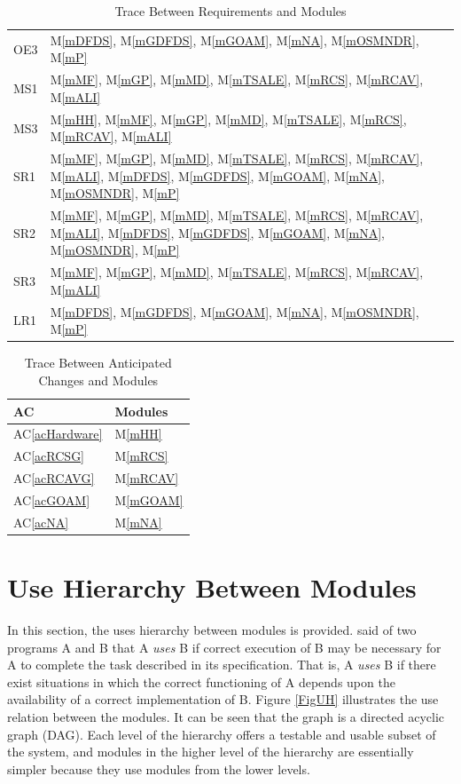 \documentclass[12pt, titlepage]{article}
\newcommand{\acref}[1]{AC\ref{#1}}
\newcommand{\mref}[1]{M\ref{#1}}
\begin{document}
\begin{table}[H]
\begin{tabular}{p{} p{}}
OE3 & \mref{mDFDS}, \mref{mGDFDS}, \mref{mGOAM}, \mref{mNA}, \mref{mOSMNDR}, \mref{mP}\\
MS1 & \mref{mMF}, \mref{mGP}, \mref{mMD}, \mref{mTSALE}, \mref{mRCS}, \mref{mRCAV}, \mref{mALI}\\
MS3 & \mref{mHH}, \mref{mMF}, \mref{mGP}, \mref{mMD},  \mref{mTSALE}, \mref{mRCS}, \mref{mRCAV}, \mref{mALI}\\
SR1 & \mref{mMF}, \mref{mGP}, \mref{mMD},  \mref{mTSALE}, \mref{mRCS}, \mref{mRCAV}, \mref{mALI}, \mref{mDFDS}, \mref{mGDFDS}, \mref{mGOAM}, \mref{mNA}, \mref{mOSMNDR}, \mref{mP}\\
SR2 & \mref{mMF}, \mref{mGP}, \mref{mMD},  \mref{mTSALE}, \mref{mRCS}, \mref{mRCAV}, \mref{mALI}, \mref{mDFDS}, \mref{mGDFDS}, \mref{mGOAM}, \mref{mNA}, \mref{mOSMNDR}, \mref{mP}\\
SR3 & \mref{mMF}, \mref{mGP}, \mref{mMD}, \mref{mTSALE}, \mref{mRCS}, \mref{mRCAV}, \mref{mALI}\\
LR1 & \mref{mDFDS}, \mref{mGDFDS}, \mref{mGOAM}, \mref{mNA}, \mref{mOSMNDR}, \mref{mP}\\



\bottomrule
\end{tabular}
\caption{Trace Between Requirements and Modules}
\label{TblRT}
\end{table}

\begin{table}[H]
\centering
\begin{tabular}{p{} p{}}
\toprule
\textbf{AC} & \textbf{Modules}\\
\midrule
\acref{acHardware} & \mref{mHH}\\
\acref{acRCSG} & \mref{mRCS}\\
\acref{acRCAVG} & \mref{mRCAV}\\
\acref{acGOAM} & \mref{mGOAM}\\
\acref{acNA} & \mref{mNA}\\
\bottomrule
\end{tabular}
\caption{Trace Between Anticipated Changes and Modules}
\label{TblACT}
\end{table}

\section{Use Hierarchy Between Modules} \label{SecUse}

In this section, the uses hierarchy between modules is
provided. \citet{Parnas1978} said of two programs A and B that A {\em uses} B if
correct execution of B may be necessary for A to complete the task described in
its specification. That is, A {\em uses} B if there exist situations in which
the correct functioning of A depends upon the availability of a correct
implementation of B.  Figure \ref{FigUH} illustrates the use relation between
the modules. It can be seen that the graph is a directed acyclic graph
(DAG). Each level of the hierarchy offers a testable and usable subset of the
system, and modules in the higher level of the hierarchy are essentially simpler
because they use modules from the lower levels.
\end{document}

